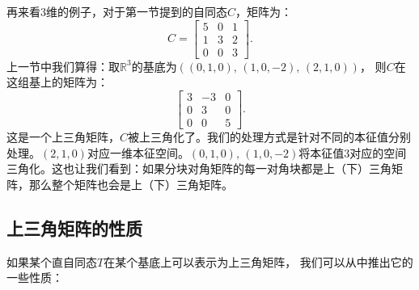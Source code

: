 \documentclass[12pt,UTF8]{ctexbook}
\begin{document}
再来看$3$维的例子，对于第一节提到的自同态$C$，矩阵为：
$$
C = \begin{bmatrix} 5 & 0 & 1 \\ 1 & 3 & 2 \\ 0 & 0 & 3 \end{bmatrix}.
$$
上一节中我们算得：取$\mathbb{R}^3$的基底为$((0,1,0),\, (1,0,-2),\, (2,1,0))$，
则$C$在这组基上的矩阵为：
$$
\begin{bmatrix} 3 & -3 & 0 \\ 0 & 3 & 0 \\ 0 & 0 & 5 \end{bmatrix}.
$$
这是一个上三角矩阵，$C$被上三角化了。我们的处理方式是针对不同的本征值分别处理。$(2,1,0)$对应一维本征空间。$(0,1,0),\, (1,0,-2)$将本征值$3$对应的空间三角化。这也让我们看到：如果分块对角矩阵的每一对角块都是上（下）三角矩阵，那么整个矩阵也会是上（下）三角矩阵。

\subsection{上三角矩阵的性质}
如果某个直自同态$T$在某个基底上可以表示为上三角矩阵，
我们可以从中推出它的一些性质：
\end{document}

